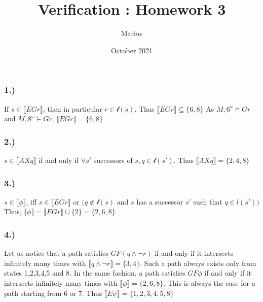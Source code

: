 \documentclass[11pt]{article}
\title{Verification : Homework 3}
\author{Marius }
\date{October 2021}
\renewcommand{\l}{\mathcal{l}}
\begin{document}
\maketitle
\subsubsection*{1.)}
If $s \in \llbracket EGr \rrbracket$, then in particular $r \in \l(s)$.\newline
Thus  $\llbracket EGr \rrbracket \subseteq \{ 6,8\}$\newline
As $M,6^\omega \models Gr$ and $M,8^\omega \models Gr$, $\llbracket EGr \rrbracket = \{ 6,8\}$ \newline
\subsubsection*{2.)}
$s \in \llbracket AXq \rrbracket$ if and only if $\forall s'$ successors of $s, q \in \l(s')$.\newline
Thus  $\llbracket AXq \rrbracket = \{2,4,8\}$\newline
\subsubsection*{3.)}
$s \in \llbracket \phi \rrbracket$, iff $s \in \llbracket EGr \rrbracket$ or $(q \notin \l(s)$ and $s$ has a successor $s'$ such that $q \in l(s'))$ \newline
Thus, $\llbracket \phi \rrbracket = \llbracket EGr \rrbracket \cup \{2\} = \{2,6,8\} $\newline
\subsubsection*{4.)}
Let us notice that a path satisfies $GF(q \wedge \neg r)$ if and only if it intersects infinitely many times with $\llbracket q \wedge \neg r \rrbracket = \{3,4\}$. \newline
Such a path always exists only from states 1,2,3,4,5 and 8. \newline
In the same fashion, a path satisfies $GF\phi$ if and only if it intersects infinitely many times with $\llbracket \phi \rrbracket = \{2,6,8\}$. \newline
This is always the case for a path starting from 6 or 7. \newline
Thus $\llbracket E\psi \rrbracket = \{1,2,3,4,5,8\}$



	
\end{document}
